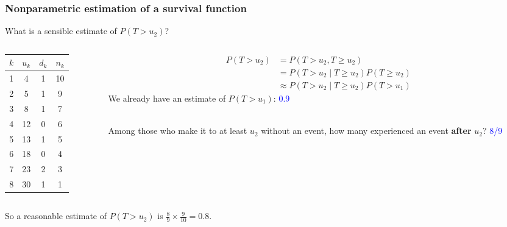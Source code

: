 \documentclass[10pt,t]{beamer}
\begin{document}
\begin{frame}
	\frametitle{Nonparametric estimation of a survival function}
	What is a sensible estimate of $P(T > u_2)$?
	
	\begin{columns}
		\begin{column}{0.3\textwidth}
			\begin{center}
\begin{tabular}{|c|c|c|c|}
	\hline
	$k$ & $u_k$ & $d_k$ & $n_k$ \\
	\hline
	1 & 4 & 1 & 10 \\
	2& 5 & 1 & 9 \\
	3& 8 & 1 & 7 \\
	4&12 & 0 & 6 \\
	5&13 & 1 & 5 \\
	6&18 & 0 & 4 \\
	7&23 & 2 & 3 \\
	8&30 & 1 & 1 \\
	\hline
\end{tabular}
			\end{center}
		\end{column}
		\begin{column}{0.7\textwidth}  %
			\begin{align*}
				P(T > u_2) &= P(T > u_2, T\geq u_2) \\
				&= P(T > u_2 \mid T \geq u_2)P(T \geq u_2)\\
				&\approx P(T > u_2 \mid T \geq u_2)P(T > u_1)
			\end{align*}
			We already have an estimate of $P(T > u_1)$: \textcolor{blue}{0.9}  
			\\ ~\ 
			
			Among those who make it to at least $u_2$ without an event, how many experienced an event \textbf{after} $u_2$?   \textcolor{blue}{8/9}
		\end{column}
	\end{columns}
	\vspace{0.5cm}
	So a reasonable estimate of $P(T > u_2)$ is $\frac{8}{9} \times \frac{9}{10} = 0.8$.
\end{frame}
\end{document}

